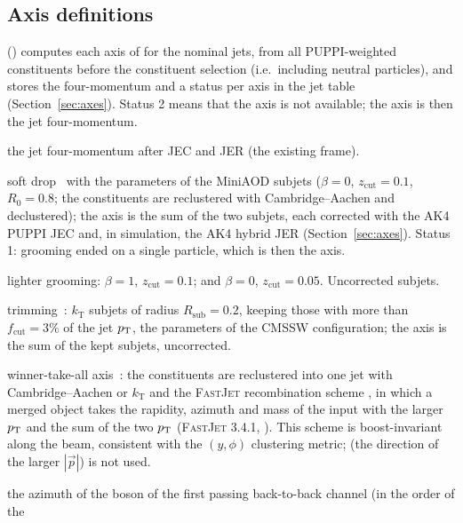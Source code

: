 \subsection{Axis definitions}
\label{app:axes:definitions}
 () computes each axis of  for the nominal jets,
from all PUPPI-weighted constituents before the constituent selection (i.e.\ including neutral particles), and stores
the four-momentum and a status per axis in the jet table (Section~\ref{sec:axes}). Status 2 means that the axis is not
available; the axis is then the jet four-momentum.
\begin{description}[style=nextline]
\item[\code{jet}] the jet four-momentum after JEC and JER (the existing  frame).
\item[\code{axisSoftDrop}] soft drop~\cite{Larkoski:2014wba} with the parameters of the MiniAOD 
  subjets ($\beta = 0$, $z_\mathrm{cut} = 0.1$, $R_0 = 0.8$; the constituents are reclustered with
  Cambridge--Aachen and declustered); the axis is the sum of the two subjets, each corrected with the AK4 PUPPI JEC and,
  in simulation, the AK4 hybrid JER (Section~\ref{sec:axes}). Status 1: grooming ended on a single particle, which
  is then the axis.
\item[\code{axisSoftDropB1}, \code{axisSoftDropZ005}] lighter grooming: $\beta = 1$, $z_\mathrm{cut} = 0.1$; and
  $\beta = 0$, $z_\mathrm{cut} = 0.05$. Uncorrected subjets.
\item[\code{axisTrim}] trimming~\cite{Krohn:2009th}: $k_\mathrm{T}$ subjets of radius $R_\mathrm{sub} = 0.2$, keeping
  those with more than $f_\mathrm{cut} = 3\%$ of the jet $p_{\mathrm{T}}$, the parameters of the CMSSW 
  configuration; the axis is the sum of the kept subjets, uncorrected.
\item[\code{axisWtaCA}, \code{axisWtaKT}] winner-take-all axis~\cite{Larkoski:2014uqa}: the constituents are reclustered
  into one jet with Cambridge--Aachen or $k_\mathrm{T}$ and the \textsc{FastJet} recombination scheme
  , in which a merged object takes the rapidity, azimuth and mass of the input with the larger
  $p_{\mathrm{T}}$ and the sum of the two $p_{\mathrm{T}}$ (\textsc{FastJet} 3.4.1, ). This scheme is boost-invariant
  along the beam, consistent with the $(y,\phi)$ clustering metric;  (the direction of the
  larger $|\vec p|$) is not used.
\item[\code{axisRecoil}] the azimuth of the boson of the first passing back-to-back channel (in the order of the

\end{description}
